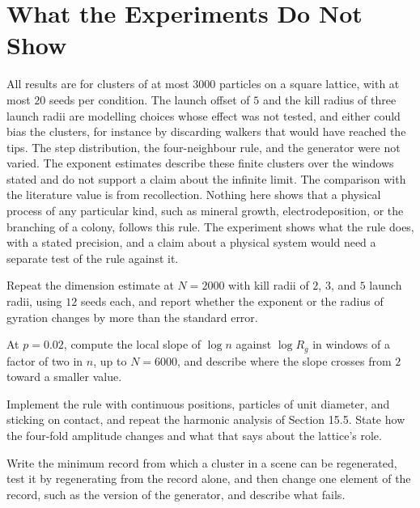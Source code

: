 \section{What the Experiments Do Not Show}

All results are for clusters of at most $3000$ particles on a square lattice, with at most $20$ seeds per condition. The launch offset of $5$ and the kill radius of three launch radii are modelling choices whose effect was not tested, and either could bias the clusters, for instance by discarding walkers that would have reached the tips. The step distribution, the four-neighbour rule, and the generator were not varied. The exponent estimates describe these finite clusters over the windows stated and do not support a claim about the infinite limit. The comparison with the literature value is from recollection. Nothing here shows that a physical process of any particular kind, such as mineral growth, electrodeposition, or the branching of a colony, follows this rule. The experiment shows what the rule does, with a stated precision, and a claim about a physical system would need a separate test of the rule against it.

\begin{exercise}
Repeat the dimension estimate at $N=2000$ with kill radii of $2$, $3$, and $5$ launch radii, using $12$ seeds each, and report whether the exponent or the radius of gyration changes by more than the standard error.
\end{exercise}

\begin{exercise}
At $p=0.02$, compute the local slope of $\log n$ against $\log R_g$ in windows of a factor of two in $n$, up to $N=6000$, and describe where the slope crosses from $2$ toward a smaller value.
\end{exercise}

\begin{exercise}
Implement the rule with continuous positions, particles of unit diameter, and sticking on contact, and repeat the harmonic analysis of Section 15.5. State how the four-fold amplitude changes and what that says about the lattice's role.
\end{exercise}

\begin{exercise}
Write the minimum record from which a cluster in a scene can be regenerated, test it by regenerating from the record alone, and then change one element of the record, such as the version of the generator, and describe what fails.
\end{exercise}
